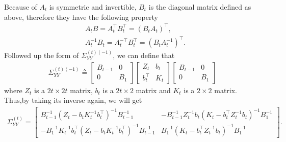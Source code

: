 Because of $A_t$ is symmetric and invertible, $B_t$ is the diagonal matrix defined as above, therefore they have the following property 
\begin{align*}
& A_tB=A_t^\top B_t^\top = \left(B_tA_t\right)^\top, \\
& A_t^{-1}B_t = A_t^{-\top}B_t^\top = \left(B_tA_t^{-1}\right)^\top. 
\end{align*}
Followed up the form of $\Sigma_{YY}^{(t) (-1)}$, we can define that 
\begin{align*}
\Sigma_{YY}^{(t) (-1)} \triangleq \begin{bmatrix} 
B_{t-1} & 0 \\ 0 & B_1 \end{bmatrix}
\begin{bmatrix} 
Z_{t} & b_{t} \\
b_{t}^\top & K_{t}
\end{bmatrix} \begin{bmatrix} 
B_{t-1} & 0 \\ 0 & B_1\end{bmatrix}
\end{align*}
where $Z_{t}$ is a $2t \times 2t$ matrix, $ b_{t} $ is a $2t \times 2$ matrix and $K_{t}$ is a $2 \times 2$ matrix. Thus,by taking its inverse again, we will get 
\begin{align*} 
\Sigma_{YY}^{\left(t\right)}= \begin{bmatrix}
B_{t-1}^{-1} \left(Z_{t}-b_{t}K_{t}^{-1}b_{t}^\top\right)^{-1}B_{t-1}^{-1}  & - B_{t-1}^{-1}  Z_{t}^{-1}b_{t}\left(K_{t}-b_{t}^\top Z_{t}^{-1}b_{t}\right)^{-1}B_1^{-1} \\
-B_1^{-1}  K_{t}^{-1}b_{t}^\top \left(Z_{t}-b_{t}K_{t}^{-1}b_{t}^\top\right)^{-1}B_{t-1}^{-1}  & B_1^{-1}  \left(K_{t}-b_{t}^\top Z_{t}^{-1}b_{t}\right)^{-1}B_1^{-1} 
\end{bmatrix}.
\end{align*}


